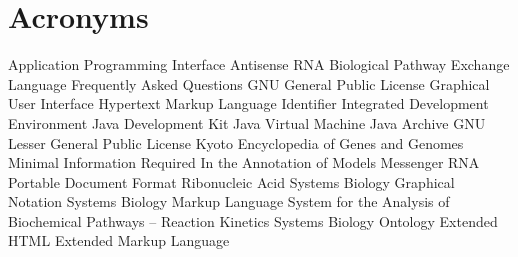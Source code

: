 \chapter{Acronyms}
\begin{acronym}
        {Application Programming Interface}
      {Antisense RNA}
     {Biological Pathway Exchange Language}
        {Frequently Asked Questions}
        {GNU General Public License}
        {Graphical User Interface}
       {Hypertext Markup Language}
         {Identifier}
        {Integrated Development Environment}
        {Java\texttrademark{} Development Kit}
        {Java\texttrademark{} Virtual Machine}
        {Java\texttrademark{} Archive}
       {GNU Lesser General Public License}
       {Kyoto Encyclopedia of Genes and Genomes}
     {Minimal Information Required In the Annotation of Models}
       {Messenger RNA}
        {Portable Document Format}
        {Ribonucleic Acid}
       {Systems Biology Graphical Notation}
       {Systems Biology Markup Language}
   {System for the Analysis of Biochemical Pathways -- Reaction Kinetics}
        {Systems Biology Ontology}
      {Extended \acs{HTML}}
        {Extended Markup Language}
\end{acronym}
